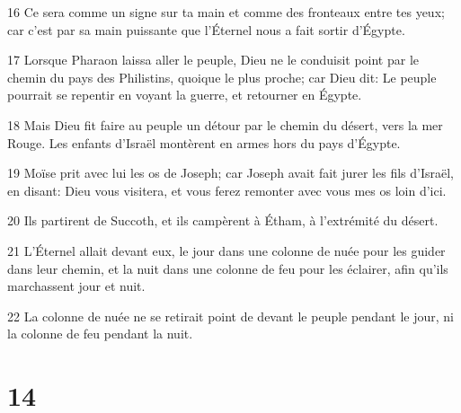 \par 16 Ce sera comme un signe sur ta main et comme des fronteaux entre tes yeux; car c'est par sa main puissante que l'Éternel nous a fait sortir d'Égypte.
\par 17 Lorsque Pharaon laissa aller le peuple, Dieu ne le conduisit point par le chemin du pays des Philistins, quoique le plus proche; car Dieu dit: Le peuple pourrait se repentir en voyant la guerre, et retourner en Égypte.
\par 18 Mais Dieu fit faire au peuple un détour par le chemin du désert, vers la mer Rouge. Les enfants d'Israël montèrent en armes hors du pays d'Égypte.
\par 19 Moïse prit avec lui les os de Joseph; car Joseph avait fait jurer les fils d'Israël, en disant: Dieu vous visitera, et vous ferez remonter avec vous mes os loin d'ici.
\par 20 Ils partirent de Succoth, et ils campèrent à Étham, à l'extrémité du désert.
\par 21 L'Éternel allait devant eux, le jour dans une colonne de nuée pour les guider dans leur chemin, et la nuit dans une colonne de feu pour les éclairer, afin qu'ils marchassent jour et nuit.
\par 22 La colonne de nuée ne se retirait point de devant le peuple pendant le jour, ni la colonne de feu pendant la nuit.

\chapter{14}

